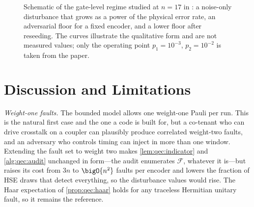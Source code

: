 \begin{figure}[htbp]
\centering
{}
\caption{Schematic of the gate-level regime studied at $n=17$ in \cite{guo2026qecaudit}: a noise-only disturbance that grows as a power of the physical error rate, an adversarial floor for a fixed encoder, and a lower floor after reseeding. The curves illustrate the qualitative form and are not measured values; only the operating point $p_1=10^{-3}$, $p_2=10^{-2}$ is taken from the paper.}
\label{fig:qec:stim}
\end{figure}

\section{Discussion and Limitations}\label{sec:qec:discussion}

\emph{Weight-one faults.} The bounded model allows one weight-one Pauli per run. This is the natural first case and the one a code is built for, but a co-tenant who can drive crosstalk on a coupler can plausibly produce correlated weight-two faults, and an adversary who controls timing can inject in more than one window. Extending the fault set to weight two makes \cref{lem:qec:indicator} and \cref{alg:qec:audit} unchanged in form---the audit enumerates $\mathcal{F}$, whatever it is---but raises its cost from $3n$ to $\bigO{n^{2}}$ faults per encoder and lowers the fraction of HSE draws that detect everything, so the disturbance values would rise. The Haar expectation of \cref{prop:qec:haar} holds for any traceless Hermitian unitary fault, so it remains the reference.

